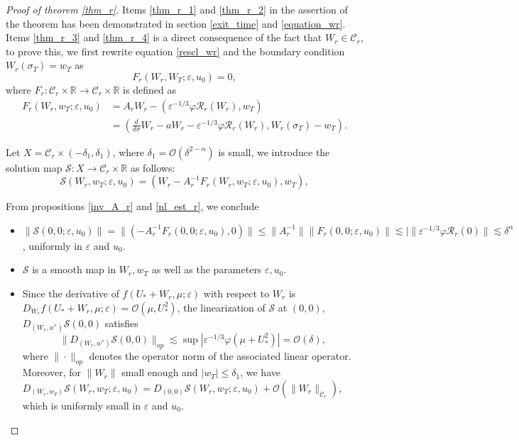 \documentclass[letterpaper,11pt]{article}
\newcommand{\Ral}{\mathcal{R}}
\newcommand{\rmO}{\mathcal{O}}
\newcommand{\eps}{\varepsilon}
\newcommand{\lar}{ \lesssim }
\numberwithin{equation}{section}
\theoremstyle{plain}
\begin{document}
\begin{proof}[Proof of theorem \ref{thm_r}]
Items \ref{thm_r_1} and \ref{thm_r_2} in the assertion of the theorem has been demonstrated in section \ref{exit_time} and \ref{equation_wr}. Items \ref{thm_r_3} and \ref{thm_r_4} is a direct consequence of the fact that $W_r \in \mathcal{C}_r$, to prove this, we first rewrite equation \eqref{rescl_wr} and the boundary condition $W_r(\sigma_T)=w_T$ as 
\[
F_r(W_r, W_T; \eps, u_0) = 0,
\]
where $F_r : \mathcal{C}_r\times \mathbb{R} \to \mathcal{C}_r\times \mathbb{R}$ is defined as
\begin{align*}
F_r(W_r,w_T;\eps,u_0) &= A_rW_r - \left(\eps^{-1/3}\varphi \Ral_r(W_r), w_T \right)\\
&=\left( \frac{d}{d\sigma}W_r-aW_r - \eps^{-1/3}\varphi \Ral_r(W_r), W_r(\sigma_T)-w_T \right).
\end{align*} 


Let $X = \mathcal{C}_r \times (-\delta_1,
\delta_1)$, where $\delta_1 = \rmO(\delta^{2-\alpha})$ is small, we introduce the solution map $\mathcal{S}: X \to \mathcal{C}_r\times \mathbb{R}$ as follows:
\[
\mathcal{S}(W_r,w_T; \eps, u_0) = (W_r-A_r^{-1}F_r(W_r,w_T;\eps, u_0), w_T),
\]

From propositions \ref{inv_A_r} and \ref{nl_est_r}, we conclude 
\begin{itemize}
\item $\|\mathcal{S}(0,0;\eps,u_0) \|= \|\left( -A_r^{-1}F_r(0,0;\eps,u_0),0\right)\| \le \|A_r^{-1}\|\|F_r(0,0;\eps,u_0)\| \lar |\|\eps^{-1/3}\varphi \Ral_r(0)\| \lar \delta^\alpha$, uniformly in $\eps$ and $u_0$.

\item $\mathcal{S}$ is a smooth map in $W_r,w_T$ as well as the parameters $\eps, u_0$.

\item Since the derivative of $f(U_*+W_r,\mu;\eps)$ with respect to $W_r$ is $D_{W_r} f(U_*+W_r,\mu;\eps)=\rmO(\mu, U_*^2)$, the linearization of $\mathcal{S}$ at $(0,0)$, $D_{(W_r,w^*)} \mathcal{S}(0,0)$ satisfies
\[
\|D_{(W_r,w^*)} \mathcal{S}(0,0)\|_{op} \lar \sup|\eps^{-1/3}\varphi(\mu+U_*^2)| = \rmO(\delta),
\]
where $\|\cdot\|_{op}$ denotes the operator norm of the associated linear operator.
Moreover, for $\|W_r\|$ small enough and $|w_T|\le \delta_1$, we have $D_{(W_r,w_T)}\mathcal{S}(W_r,w_T;\eps,u_0) =  D_{(0,0)}\mathcal{S}(W_r,w_T;\eps,u_0)+\rmO(\|W_r\|_{\mathcal{C}_r})$, which is uniformly small in $\eps$ and $u_0$.


\end{itemize}
\end{proof}
\end{document}

